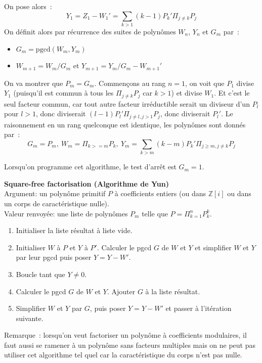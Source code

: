 \documentclass[a4paper,11pt]{article}
\newcommand{\Z}{{\mathbb{Z}}}
\begin{document}
On pose alors~:
\[ Y_1=Z_1-W_1'=\sum_{k>1} (k-1)P_k' \Pi_{j\neq k} P_j \]
On définit alors par récurrence des suites de polynômes $W_n$, $Y_n$ et
$G_m$ par~:
\begin{itemize}
\item $G_m=\mbox{pgcd}(W_m,Y_m)$
\item $W_{m+1}=W_m/G_m$ et $Y_{m+1}=Y_m/G_m-W_{m+1}'$
\end{itemize}
On va montrer que $P_m=G_m$. Commençons au rang $n=1$, on voit que $P_1$
divise $Y_1$ (puisqu'il est commun à tous les $\Pi_{j\neq k} P_j$ car
$k>1$) et divise $W_1$. Et c'est le seul facteur commun, car tout autre
facteur irréductible serait un diviseur d'un $P_l$ pour $l>1$, donc diviserait
$(l-1)P_l'\Pi_{j\neq l,j>1} P_j$, donc diviserait $P_l'$.
Le raisonnement en un rang quelconque est identique, les polynômes sont
donnés par~:
\[ G_m=P_m, \ W_{m}=\Pi_{k>=m} P_k, \ 
Y_{m}=\sum_{k>m} (k-m)P_k'\Pi_{j\geq m, j\neq k} P_j \]

Lorsqu'on programme cet algorithme, le test d'arrêt est $G_m=1$.

{\bf Square-free factorisation (Algorithme de Yun)}\\
Argument: un polynôme primitif $P$ à coefficients entiers (ou dans $\Z[i]$
ou dans un corps de caractéristique nulle).\\
Valeur renvoyée: une liste de polynômes $P_m$ telle que 
$P=\Pi_{k=1}^n P_k^k$.\\
\begin{enumerate}
\item Initialiser la liste résultat à liste vide.
\item Initialiser $W$ à $P$ et $Y$ à $P'$. Calculer le pgcd $G$ de $W$ et $Y$
et simplifier $W$ et $Y$ par leur pgcd puis poser $Y=Y-W'$.
\item Boucle tant que $Y\neq 0$.
\item Calculer le pgcd $G$ de $W$ et $Y$. Ajouter $G$ à la liste résultat.
\item Simplifier $W$ et $Y$ par $G$, puis poser $Y=Y-W'$ et passer à 
l'itération suivante.
\end{enumerate}

Remarque~: lorsqu'on veut factoriser un polynôme à coefficients modulaires,
il faut aussi se ramener à un polynôme sans facteurs multiples mais
on ne peut pas utiliser cet algorithme tel quel car la caractéristique
du corps n'est pas nulle.
\end{document}
